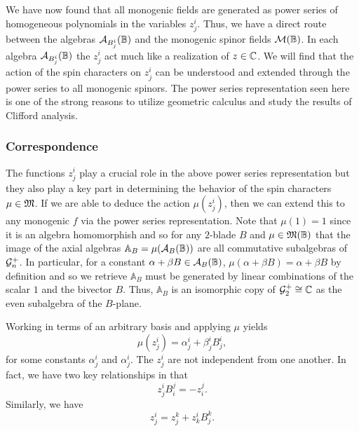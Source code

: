 We have now found that all monogenic fields are generated as power series of homogeneous polynomials in the variables $z_j^i$. Thus, we have a direct route between the algebras $\mathcal{A}_{B_j^i}(\mathbb{B})$ and the monogenic spinor fields $\mathcal{M}(\mathbb{B})$.  In each algebra $\mathcal{A}_{B_j^i}(\mathbb{B})$ the $z_j^i$ act much like a realization of $z\in \mathbb{C}$.  We will find that the action of the spin characters on $z_j^i$ can be understood and extended through the power series to all monogenic spinors. The power series representation seen here is one of the strong reasons to utilize geometric calculus and study the results of Clifford analysis. 



\subsubsection{Correspondence}

The functions $z_j^i$ play a crucial role in the above power series representation but they also play a key part in determining the behavior of the spin characters $\mu \in \mathfrak{M}$.  If we are able to deduce the action $\mu(z_j^i)$, then we can extend this to any monogenic $f$ via the power series representation. Note that $\mu(1)=1$ since it is an algebra homomorphish and so for any $2$-blade $B$ and $\mu \in \mathfrak{M}(\mathbb{B})$ that the image of the axial algebras $\mathbb{A}_B=\mu(\mathcal{A}_{B}(\mathbb{B}))$ are all commutative subalgebras of $\mathcal{G}_n^+$.  In particular, for a constant $\alpha+\beta B \in \mathcal{A}_{B}(\mathbb{B})$, $\mu(\alpha+\beta B)=\alpha+\beta B$ by definition and so we retrieve $\mathbb{A}_B$ must be generated by linear combinations of the scalar $1$ and the bivector $B$.  Thus, $\mathbb{A}_B$ is an isomorphic copy of $\mathcal{G}_2^+ \cong \mathbb{C}$ as the even subalgebra of the $B$-plane.

Working in terms of an arbitrary basis and applying $\mu$ yields
\[
\mu(z_j^i) = \alpha_j^i + \beta_j^i B_j^i,
\]
for some constants $\alpha_j^i$ and $\alpha_j^i$.  The $z_j^i$ are not independent from one another.  In fact, we have two key relationships in that
\begin{equation}
\label{eq:z_reciprocal_relationship}
z_j^i B_i^j  = -z_i^j.
\end{equation}
Similarly, we have
\begin{equation}
\label{eq:z_relationship}
z_j^i = z_j^k + z_k^i B_j^k.
\end{equation}

